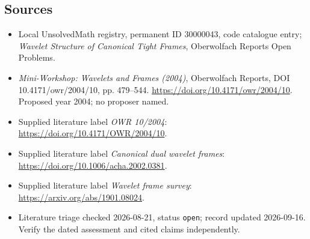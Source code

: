 \documentclass[11pt]{article}
\begin{document}
\subsection{Sources}
\begin{itemize}\item Local UnsolvedMath registry, permanent ID 30000043, code catalogue entry; \emph{Wavelet Structure of Canonical Tight Frames}, Oberwolfach Reports Open Problems.\item \emph{Mini-Workshop: Wavelets and Frames (2004)}, Oberwolfach Reports, DOI 10.4171/owr/2004/10, pp. 479--544. \url{https://doi.org/10.4171/owr/2004/10}. Proposed year 2004; no proposer named.\item Supplied literature label \emph{OWR 10/2004}: \url{https://doi.org/10.4171/OWR/2004/10}.\item Supplied literature label \emph{Canonical dual wavelet frames}: \url{https://doi.org/10.1006/acha.2002.0381}.\item Supplied literature label \emph{Wavelet frame survey}: \url{https://arxiv.org/abs/1901.08024}.\item Literature triage checked 2026-08-21, status \texttt{open}; record updated 2026-09-16. Verify the dated assessment and cited claims independently.\end{itemize}
\end{document}
